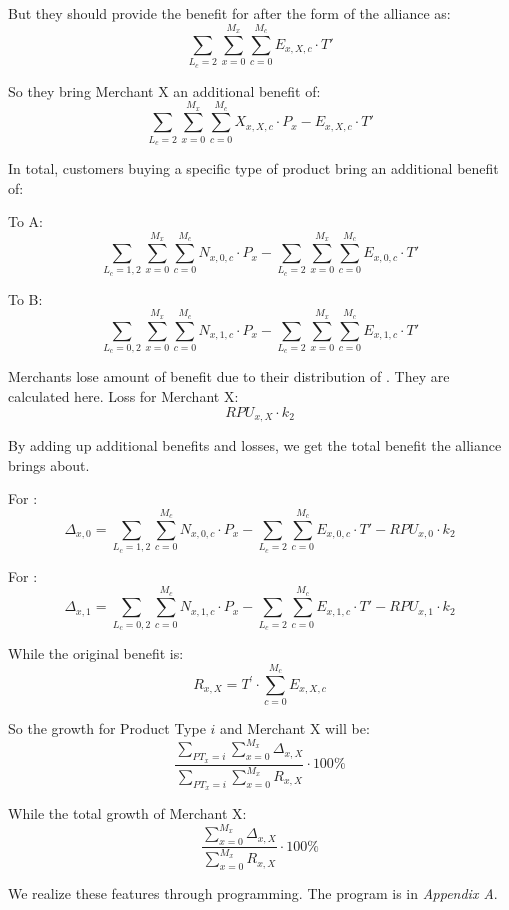 \begin{enumerate}[label=(\arabic*)]
\begin{enumerate}[label=(\alph*)]
But they should provide the benefit for  after the form of the alliance as:
\[
\sum\limits_{L_c  = 2} {\sum\limits_{x = 0}^{M_x} {\sum\limits_{c = 0}^{M_c} {E_{x,X,c}  \cdot T'} } } 
\]

So they bring Merchant X an additional benefit of:
\[
\sum\limits_{L_c  = 2} {\sum\limits_{x = 0}^{M_x} } {\sum\limits_{c = 0}^{M_c} } {X_{x,X,c}  \cdot P_x  - E_{x,X,c}  \cdot T'} 
\]

In total, customers buying a specific type of product bring an additional benefit of:

\phantom{LATEX WO RI NI MA}

\noindent To A:
\[
\sum\limits_{L_c  = 1,2} {\sum\limits_{x = 0}^{M_x} } {\sum\limits_{c = 0}^{M_c} } {N_{x,0,c}  \cdot P_x }  - \sum\limits_{L_c  = 2} {\sum\limits_{x = 0}^{M_x} } {\sum\limits_{c = 0}^{M_c} } {E_{x,0,c}  \cdot T'}
\]

\phantom{LATEX CHAO JI SHA BI}

\noindent To B:
\[
\sum\limits_{L_c  = 0,2} {\sum\limits_{x = 0}^{M_x} } {\sum\limits_{c = 0}^{M_c} } {N_{x,1,c}  \cdot P_x }  - \sum\limits_{L_c  = 2} {\sum\limits_{x = 0}^{M_x}} {\sum\limits_{c = 0}^{M_c} } {E_{x,1,c}  \cdot T'}
\]

\end{enumerate}


Merchants lose amount of benefit due to their distribution of \RPd. They are calculated here. Loss for Merchant X:
\[  RPU_{x,X} \cdot k_2  \]


By adding up additional benefits and losses, we get the total benefit the alliance brings about.

For \A:
\[
\Delta _{x,0}  = \sum\limits_{L_c  = 1,2} {\sum\limits_{c = 0}^{M_c} } {N_{x,0,c} }  \cdot P_x  - \sum\limits_{L_c  = 2} {\sum\limits_{c = 0}^{M_c} {E_{x,0,c}  \cdot T'} - RPU_{x,0}  \cdot k_2 }
\]

For \B:
\[
\Delta _{x,1}  = \sum\limits_{L_c  = 0,2} {\sum\limits_{c = 0}^{M_c} } {N_{x,1,c} }  \cdot P_x  - \sum\limits_{L_c  = 2} {\sum\limits_{c = 0}^{M_c} {E_{x,1,c}  \cdot T'} - RPU_{x,1}  \cdot k_2 }
\]

While the original benefit is:
\[  R_{x,X} = T^\prime \cdot \sum\limits_{c=0}^{M_c} E_{x,X,c}  \]

So the growth for Product Type $i$ and Merchant X will be:
\[
\frac{{\sum\limits_{PT_x  = i} {\sum\limits_{x = 0}^{M_x} {\Delta _{x,X} } } }}{{\sum\limits_{PT_x  = i} {\sum\limits_{x = 0}^{M_x} {R_{x,X} } } }} \cdot 100\% 
\]

While the total growth of Merchant X:
\[  \frac
{\sum\limits_{x=0}^{M_x} \Delta_{x,X}}
{\sum\limits_{x=0}^{M_x} R_{x,X}}
\cdot 100\%
\]

\end{enumerate}

We realize these features through programming. The program is in \textsl{Appendix A}.